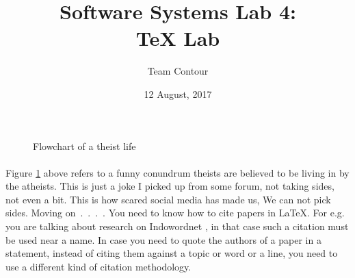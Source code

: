 \documentclass[titlepage,11pt]{article}
\begin{document}
\title{Software Systems Lab 4:\\TeX Lab}
\author{Team Contour}
\date{12 August, 2017}
\maketitle

\newpage

\begin{figure} \label{flowchart}
\centering
{}
\caption{Flowchart of a theist life}
\end{figure}

\paragraph{} Figure \ref{flowchart} above refers to a funny conundrum theists are believed to be living in by the atheists. This is just a joke I picked up from some forum, not taking sides, not even a bit. This is how scared social media has made us, We can not pick sides. Moving on\ .\ .\ .\ . You need to know how to cite papers in \LaTeX. For e.g. you are talking about research on Indowordnet \cite{indowordnet}, in that case such a citation must be used near a name. In case you need to quote the authors of a paper in a statement, instead of citing them against a topic or word or a line, you need to use a different kind of citation methodology.
\end{document}

